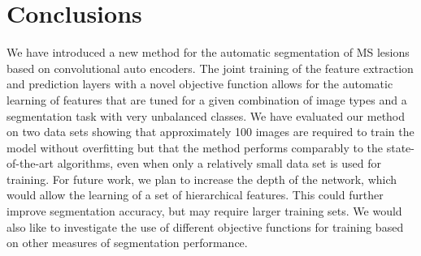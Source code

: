 \section{Conclusions}

We have introduced a new method for the automatic segmentation of MS lesions
based on convolutional auto encoders. The joint training of the feature
extraction and prediction layers with a novel objective function allows for the
automatic learning of features that are tuned for a given combination of image
types and a segmentation task with very unbalanced classes. 
We have evaluated our method on two data sets showing that approximately 100
images are required to train the model without overfitting but that the method
performs comparably to the state-of-the-art algorithms, even when only a
relatively small data set is used for training. For future work, we plan to
increase the depth of the network, which would allow the learning of a set of
hierarchical features. This could further improve segmentation accuracy, but may
require larger training sets. We would also like to investigate the use of
different objective functions for training based on other measures of
segmentation performance.


